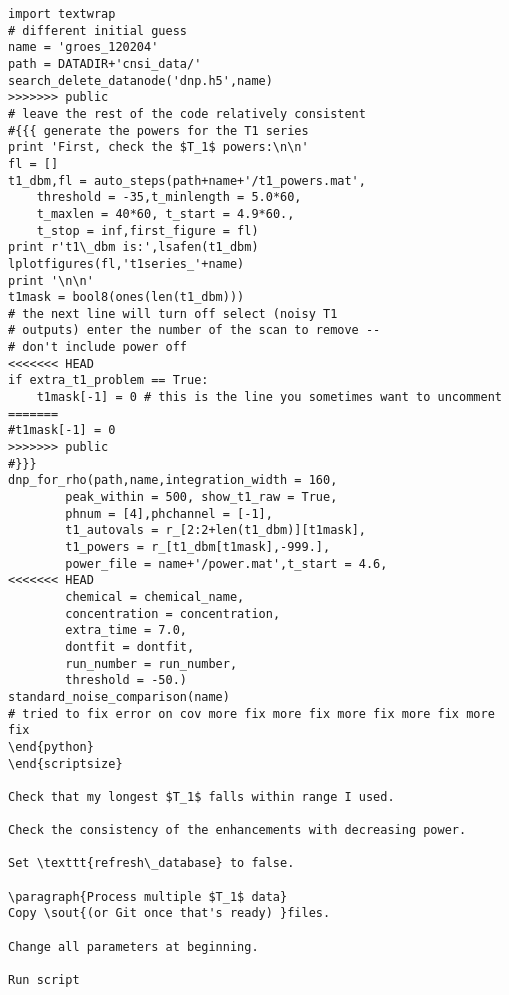 \begin{scriptsize}
\begin{python}[off]
\begin{scriptsize}
\begin{lstlisting}
import textwrap
# different initial guess
name = 'groes_120204'
path = DATADIR+'cnsi_data/'
search_delete_datanode('dnp.h5',name)
>>>>>>> public
# leave the rest of the code relatively consistent
#{{{ generate the powers for the T1 series
print 'First, check the $T_1$ powers:\n\n'
fl = []
t1_dbm,fl = auto_steps(path+name+'/t1_powers.mat',
    threshold = -35,t_minlength = 5.0*60,
    t_maxlen = 40*60, t_start = 4.9*60.,
    t_stop = inf,first_figure = fl)
print r't1\_dbm is:',lsafen(t1_dbm)
lplotfigures(fl,'t1series_'+name)
print '\n\n'
t1mask = bool8(ones(len(t1_dbm)))
# the next line will turn off select (noisy T1
# outputs) enter the number of the scan to remove --
# don't include power off
<<<<<<< HEAD
if extra_t1_problem == True:
    t1mask[-1] = 0 # this is the line you sometimes want to uncomment
=======
#t1mask[-1] = 0
>>>>>>> public
#}}}
dnp_for_rho(path,name,integration_width = 160,
        peak_within = 500, show_t1_raw = True,
        phnum = [4],phchannel = [-1],
        t1_autovals = r_[2:2+len(t1_dbm)][t1mask],
        t1_powers = r_[t1_dbm[t1mask],-999.],
        power_file = name+'/power.mat',t_start = 4.6,
<<<<<<< HEAD
        chemical = chemical_name,
        concentration = concentration,
        extra_time = 7.0,
        dontfit = dontfit,
        run_number = run_number,
        threshold = -50.)
standard_noise_comparison(name)
# tried to fix error on cov more fix more fix more fix more fix more fix
\end{python}
\end{scriptsize}

Check that my longest $T_1$ falls within range I used.

Check the consistency of the enhancements with decreasing power.

Set \texttt{refresh\_database} to false.

\paragraph{Process multiple $T_1$ data}
Copy \sout{(or Git once that's ready) }files.

Change all parameters at beginning.

Run script



\end{lstlisting}
\end{scriptsize}
\end{python}
\end{scriptsize}
